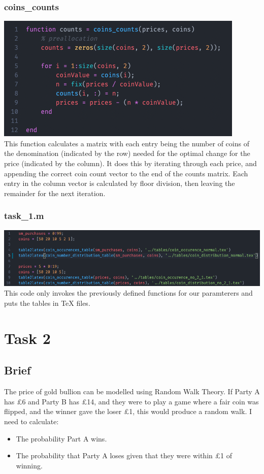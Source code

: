 \documentclass{article}
\begin{document}
\subsubsection{coins\_counts}
\includegraphics[width=\textwidth]{task_1/coins_counts.m.png}
\\
This function calculates a matrix with each entry being the number of coins of the denomination (indicated by the row) needed for the optimal change for the price (indicated by the column).
It does this by iterating through each price, and appending the correct coin count vector to the end of the counts matrix.
Each entry in the column vector is calculated by floor division, then leaving the remainder for the next iteration.

\subsubsection{task\_1.m}
\includegraphics[width=\textwidth]{task_1/task_1.m.png}
\\
This code only invokes the previously defined functions for our paramterers and puts the tables in TeX files.
\newpage
\section{Task 2}
\subsection{Brief}
The price of gold bullion can be modelled using Random Walk Theory.
If Party A has £6 and Party B has £14, and they were to play a game where a fair coin was flipped, and the winner gave the loser £1, this would produce a random walk.
I need to calculate:
\begin{itemize}
    \item The probability Part A wins.
    \item The probability that Party A loses given that they were within £1 of winning.
\end{itemize}
\end{document}
